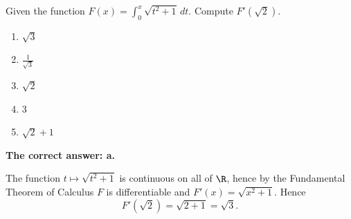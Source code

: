 
\begin{question}
Given the function $F(x)=\int_0^x\sqrt{t^2+1}\,dt$. Compute $F'(\sqrt2)$.
\begin{enumerate}
  \item $\sqrt3$
  \item $\frac{1}{\sqrt3}$
  \item $\sqrt2$
  \item $3$
  \item $\sqrt2+1$
\end{enumerate}
\end{question}

\begin{solution}
\textbf{The correct answer: a.}

The function $t\mapsto\sqrt{t^2+1}$ is continuous on all of $\R$, hence by the Fundamental Theorem of Calculus $F$ is differentiable and $F'(x)=\sqrt{x^2+1}$. Hence
\[ F'(\sqrt2)=\sqrt{2+1}=\sqrt3 . \]
\end{solution}
